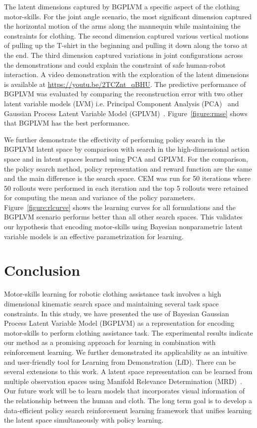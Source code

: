 \documentclass{article}
\begin{document}
The latent dimensions captured by BGPLVM a specific aspect of the clothing motor-skills. For the joint angle scenario, the most significant dimension captured the horizontal motion of the arms along the mannequin while maintaining the constraints for clothing. The second dimension captured various vertical motions of pulling up the T-shirt in the beginning and pulling it down along the torso at the end. The third dimension captured variations in joint configurations across the demonstrations and could explain the constraint of safe human-robot interaction. A video demonstration with the exploration of the latent dimensions is available at \url{https://youtu.be/2TCZnt_qBHU}. The predictive performance of BGPLVM was evaluated by comparing the reconstruction error with two other latent variable models (LVM) i.e. Principal Component Analysis (PCA)~\cite{pca} and Gaussian Process Latent Variable Model (GPLVM)~\cite{gplvm}. Figure~\ref{figure:rmse} shows that BGPLVM has the best performance.

We further demonstrate the effectivity of performing policy search in the BGPLVM latent space by comparison with search in the high-dimensional action space and in latent spaces learned using PCA and GPLVM. For the comparison, the policy search method, policy representation and reward function are the same and the main difference is the search space. CEM was run for 50 iterations where 50 rollouts were performed in each iteration and the top 5 rollouts were retained for computing the mean and variance of the policy parameters. Figure~\ref{figure:rlcurve} shows the learning curves for all formulations and the BGPLVM scenario performs better than all other search spaces. This validates our hypothesis that encoding motor-skills using Bayesian nonparametric latent variable models is an effective parametrization for learning.

\section{Conclusion}
\label{section:conclusion}

Motor-skills learning for robotic clothing assistance task involves a high dimensional kinematic search space and maintaining several task space constraints. In this study, we have presented the use of Bayesian Gaussian Process Latent Variable Model (BGPLVM) as a representation for encoding motor-skills to perform clothing assistance task. The experimental results indicate our method as a promising approach for learning in combination with reinforcement learning. We further demonstrated its applicability as an intuitive and user-friendly tool for Learning from Demonstration (LfD). There can be several extensions to this work. A latent space representation can be learned from multiple observation spaces using Manifold Relevance Determination (MRD)~\cite{mrd}. Our future work will be to learn models that incorporates visual information of the relationship between the human and cloth. The long term goal is to develop a data-efficient policy search reinforcement learning framework that unifies learning the latent space simultaneously with policy learning.
\end{document}
